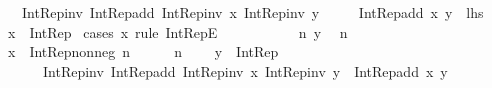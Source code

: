 \begin{isabellebody}
\ \ \ {\isachardoublequoteopen}Int{\isacharunderscore}{\kern0pt}Rep{\isacharunderscore}{\kern0pt}inv\ {\isacharparenleft}{\kern0pt}Int{\isacharunderscore}{\kern0pt}Rep{\isacharunderscore}{\kern0pt}add\ {\isacharparenleft}{\kern0pt}Int{\isacharunderscore}{\kern0pt}Rep{\isacharunderscore}{\kern0pt}inv\ x{\isacharparenright}{\kern0pt}\ {\isacharparenleft}{\kern0pt}Int{\isacharunderscore}{\kern0pt}Rep{\isacharunderscore}{\kern0pt}inv\ y{\isacharparenright}{\kern0pt}{\isacharparenright}{\kern0pt}\ {\isacharequal}{\kern0pt}\isanewline
\ \ \ \ Int{\isacharunderscore}{\kern0pt}Rep{\isacharunderscore}{\kern0pt}add\ x\ y{\isachardoublequoteclose}\ {\isacharparenleft}{\kern0pt}\ {\isachardoublequoteopen}{\isacharquery}{\kern0pt}lhs\ {\isacharequal}{\kern0pt}\ {\isacharunderscore}{\kern0pt}{\isachardoublequoteclose}{\isacharparenright}{\kern0pt}\isanewline
%
\isadelimproof
%
\endisadelimproof
%
\isatagproof
{}\isamarkupfalse%
\ {\isacartoucheopen}x\ {\isacharcolon}{\kern0pt}\ Int{\isacharunderscore}{\kern0pt}Rep{\isacartoucheclose}\isanewline
{}\isamarkupfalse%
\ {\isacharparenleft}{\kern0pt}cases\ x\ rule{\isacharcolon}{\kern0pt}\ Int{\isacharunderscore}{\kern0pt}RepE{\isacharparenright}{\kern0pt}\isanewline
\ \ \isanewline
\ \ \isacommand{{\isacharbraceleft}{\kern0pt}}\isamarkupfalse%
\isanewline
\ \ \ \ \isamarkupfalse%
\ n\ y\ \isamarkupfalse%
\ {\isachardoublequoteopen}n\ {\isasymin}\ {\isasymnat}{\isachardoublequoteclose}\isanewline
\ \ \ \ \isamarkupfalse%
\ {\isacharquery}{\kern0pt}x\ {\isacharequal}{\kern0pt}\ {\isachardoublequoteopen}Int{\isacharunderscore}{\kern0pt}Rep{\isacharunderscore}{\kern0pt}nonneg\ n{\isachardoublequoteclose}\isanewline
\ \ \ \ \isamarkupfalse%
\ {\isacartoucheopen}n\ {\isasymin}\ {\isasymnat}{\isacartoucheclose}\ \isamarkupfalse%
\ {\isachardoublequoteopen}y\ {\isacharcolon}{\kern0pt}\ Int{\isacharunderscore}{\kern0pt}Rep\ {\isasymLongrightarrow}\isanewline
\ \ \ \ \ \ Int{\isacharunderscore}{\kern0pt}Rep{\isacharunderscore}{\kern0pt}inv\ {\isacharparenleft}{\kern0pt}Int{\isacharunderscore}{\kern0pt}Rep{\isacharunderscore}{\kern0pt}add\ {\isacharparenleft}{\kern0pt}Int{\isacharunderscore}{\kern0pt}Rep{\isacharunderscore}{\kern0pt}inv\ {\isacharquery}{\kern0pt}x{\isacharparenright}{\kern0pt}\ {\isacharparenleft}{\kern0pt}Int{\isacharunderscore}{\kern0pt}Rep{\isacharunderscore}{\kern0pt}inv\ y{\isacharparenright}{\kern0pt}{\isacharparenright}{\kern0pt}\ {\isacharequal}{\kern0pt}\ Int{\isacharunderscore}{\kern0pt}Rep{\isacharunderscore}{\kern0pt}add\ {\isacharquery}{\kern0pt}x\ y{\isachardoublequoteclose}\isanewline

\end{isabellebody}
